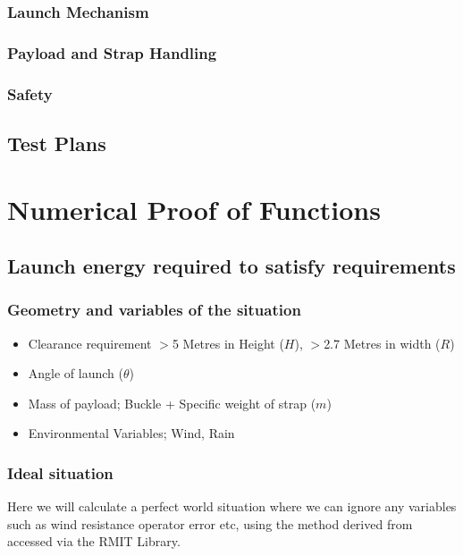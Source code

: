 \documentclass[a4paper,10pt]{article} %
\begin{document}
\subsubsection{Launch Mechanism}

\subsubsection{Payload and Strap Handling}

\subsubsection{Safety}

\subsection{Test Plans}

\newpage

\section{Numerical Proof of Functions}

\subsection{Launch energy required to satisfy requirements}

\subsubsection{Geometry and variables of the situation}

\begin{itemize}
    \item Clearance requirement $>$5 Metres in Height ($H$), $>$2.7 Metres in width ($R$)
    \item Angle of launch ($\theta$)
    \item Mass of payload; Buckle + Specific weight of strap ($m$)
    \item Environmental Variables; Wind, Rain
\end{itemize}

\subsubsection{Ideal situation}

Here we will calculate a perfect world situation where we can ignore any variables such as wind resistance operator error etc, using the method derived from \parencite{MunganCarlE.2017OtLo} accessed via the RMIT Library.
\end{document}
